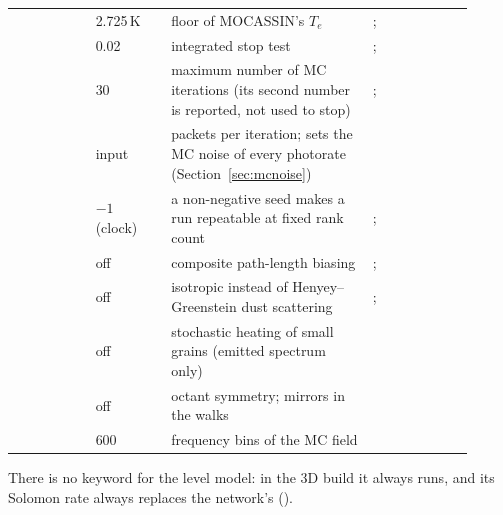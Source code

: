 \begin{longtable}{@{}L{0.16\linewidth}L{0.15\linewidth}L{0.40\linewidth}L{0.20\linewidth}@{}}
 & 2.725\,K & floor of MOCASSIN's $T_e$ & ;  \\
 & 0.02 & integrated stop test & ;  \\
 & 30 & maximum number of MC iterations (its second number is reported, not used to stop) & ;  \\
 & input & packets per iteration; sets the MC noise of every photorate (Section~\ref{sec:mcnoise}) &  \\
 & $-1$ (clock) & a non-negative seed makes a run repeatable at fixed rank count & ;  \\
 & off & composite path-length biasing \citep{Baes2016} & ;  \\
 & off & isotropic instead of Henyey--Greenstein dust scattering & ;  \\
 & off & stochastic heating of small grains (emitted spectrum only) &  \\
 & off & octant symmetry; mirrors in the walks &  \\
 & 600 & frequency bins of the MC field &  \\
\bottomrule
\end{longtable}

There is no keyword for the \Htwo{} level model: in the 3D build it always
runs, and its Solomon rate always replaces the network's ().

